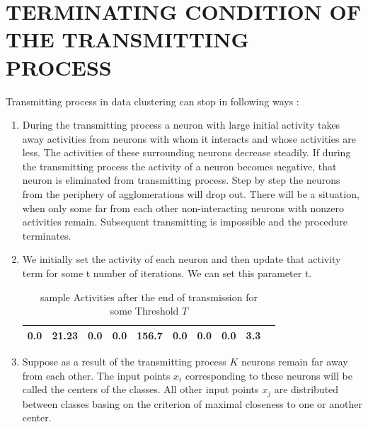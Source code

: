 \documentclass[letterpaper, 10 pt, conference]{ieeeconf}  %
\begin{document}
 
\section{TERMINATING CONDITION OF THE TRANSMITTING PROCESS}
Transmitting process in data clustering can stop in following ways :\\
\begin{enumerate}
\item During the transmitting process a neuron with large initial activity takes away  activities from neurons with whom it interacts and whose activities are less. The activities of these surrounding neurons decrease steadily. If during the transmitting process the activity of a neuron becomes negative, that neuron is eliminated from transmitting process. Step by step the neurons from the periphery of  agglomerations will drop out. There will be a situation, when only some far from each other non-interacting neurons with nonzero activities remain. Subsequent transmitting is impossible and the procedure terminates.\\
\item We initially set the activity of each neuron and then update that activity term for some t number of iterations. We can set this parameter t.\\
\begin{table}[thb]
\centering
\label{my-label}
\begin{tabular}{|l|l|l|l|l|l|l|l|l|l|}
\hline
0.0 & 21.23 & 0.0 & 0.0 & 156.7 & 0.0 & 0.0 & 0.0 & 3.3 \\ \hline
\end{tabular}
\caption{sample Activities after the end of transmission for \\ some Threshold $T$}
\end{table}
\item Suppose as a result of the transmitting process $K$ neurons remain far away from each other. The input points $x_i$ corresponding to these neurons will be called the centers of the classes. All other input points $x_j$ are distributed between classes basing on the criterion of maximal closeness to one or another center.
\end{enumerate}
\end{document}
